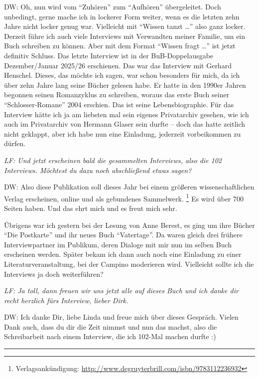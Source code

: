 \documentclass[a4paper,
fontsize=11pt,
oneside,
numbers=noperiodatend,
parskip=half-,
bibliography=totoc,
final
]{scrartcl}
\begin{document}
DW: Oh, nun wird vom \enquote{Zuhören} zum \enquote{Aufhören}
übergeleitet. Doch unbedingt, gerne mache ich in lockerer Form weiter,
wenn es die letzten zehn Jahre nicht locker genug war. Vielleicht mit
\enquote{Wissen tanzt \ldots{}} also ganz locker. Derzeit führe ich auch
viele Interviews mit Verwandten meiner Familie, um ein Buch schreiben zu
können. Aber mit dem Format \enquote{Wissen fragt \ldots{}} ist jetzt
definitiv Schluss. Das letzte Interview ist in der BuB-Doppelausgabe
Dezember/Januar 2025/26 erschienen. Das war das Interview mit Gerhard
Henschel. Dieses, das möchte ich sagen, war schon besonders für mich, da
ich über zehn Jahre lang seine Bücher gelesen habe. Er hatte in den
1990er Jahren begonnen seinen Romanzyklus zu schreiben, woraus das erste
Buch seiner \enquote{Schlosser-Romane} 2004 erschien. Das ist seine
Lebensbiographie. Für das Interview hätte ich ja am liebsten mal sein
eigenes Privatarchiv gesehen, wie ich auch im Privatarchiv von Hermann
Glaser sein durfte -- doch das hatte zeitlich nicht geklappt, aber ich
habe nun eine Einladung, jederzeit vorbeikommen zu dürfen.

\emph{LF: Und jetzt erscheinen bald die gesammelten Interviews, also die
102 Interviews. Möchtest du dazu noch abschließend etwas sagen?}

DW: Also diese Publikation soll dieses Jahr bei einem größeren
wissenschaftlichen Verlag erscheinen, online und als gebundenes
Sammelwerk. \footnote{Verlagsankündigung:
  \url{http://www.degruyterbrill.com/isbn/9783112236932}} Es wird über
700 Seiten haben. Und das ehrt mich und es freut mich sehr.

Übrigens war ich gestern bei der Lesung von Anne Berest, es ging um ihre
Bücher \enquote{Die Postkarte} und ihr neues Buch \enquote{Vatertage}.
Da waren gleich drei frühere Interviewpartner im Publikum, deren Dialoge
mit mir nun im selben Buch erscheinen werden. Später bekam ich dann auch
noch eine Einladung zu einer Literaturveranstaltung, bei der Campino
moderieren wird. Vielleicht sollte ich die Interviews ja doch
weiterführen?

\emph{LF: Ja toll, dann freuen wir uns jetzt alle auf dieses Buch und
ich danke dir recht herzlich fürs Interview, lieber Dirk.}

DW: Ich danke Dir, liebe Linda und freue mich über dieses Gespräch.
Vielen Dank auch, dass du dir die Zeit nimmst und nun das machst, also
die Schreibarbeit nach einem Interview, die ich 102-Mal machen durfte :)

\begin{center}\rule{0.5\linewidth}{0.5pt}\end{center}
\end{document}
